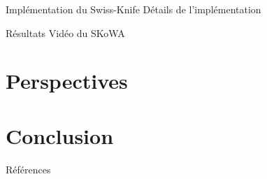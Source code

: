 \documentclass[aspectratio=169]{beamer}
\begin{document}
\begin{frame}{Implémentation du Swiss-Knife}
  Détails de l'implémentation
\end{frame}

\begin{frame}{Résultats}
  Vidéo du SKoWA
\end{frame}

\section{Perspectives}

\section{Conclusion}


\begin{frame}{Références}
  \printbibliography
\end{frame}






\end{document}
